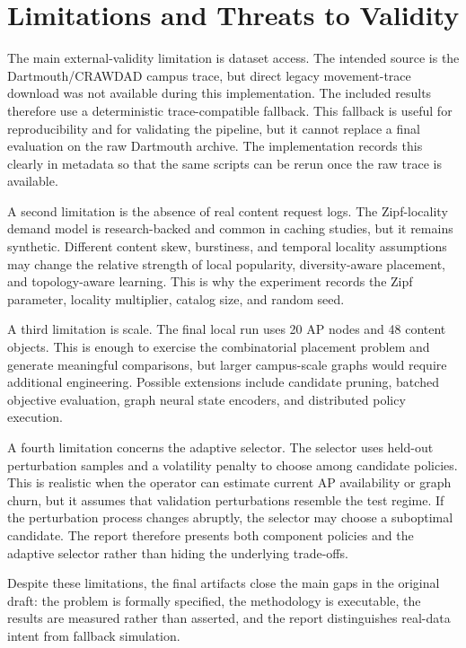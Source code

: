 \section{Limitations and Threats to Validity}

The main external-validity limitation is dataset access. The intended source is the Dartmouth/CRAWDAD campus trace, but direct legacy movement-trace download was not available during this implementation. The included results therefore use a deterministic trace-compatible fallback. This fallback is useful for reproducibility and for validating the pipeline, but it cannot replace a final evaluation on the raw Dartmouth archive. The implementation records this clearly in metadata so that the same scripts can be rerun once the raw trace is available.

A second limitation is the absence of real content request logs. The Zipf-locality demand model is research-backed and common in caching studies, but it remains synthetic. Different content skew, burstiness, and temporal locality assumptions may change the relative strength of local popularity, diversity-aware placement, and topology-aware learning. This is why the experiment records the Zipf parameter, locality multiplier, catalog size, and random seed.

A third limitation is scale. The final local run uses 20 AP nodes and 48 content objects. This is enough to exercise the combinatorial placement problem and generate meaningful comparisons, but larger campus-scale graphs would require additional engineering. Possible extensions include candidate pruning, batched objective evaluation, graph neural state encoders, and distributed policy execution.

A fourth limitation concerns the adaptive selector. The selector uses held-out perturbation samples and a volatility penalty to choose among candidate policies. This is realistic when the operator can estimate current AP availability or graph churn, but it assumes that validation perturbations resemble the test regime. If the perturbation process changes abruptly, the selector may choose a suboptimal candidate. The report therefore presents both component policies and the adaptive selector rather than hiding the underlying trade-offs.

Despite these limitations, the final artifacts close the main gaps in the original draft: the problem is formally specified, the methodology is executable, the results are measured rather than asserted, and the report distinguishes real-data intent from fallback simulation.
